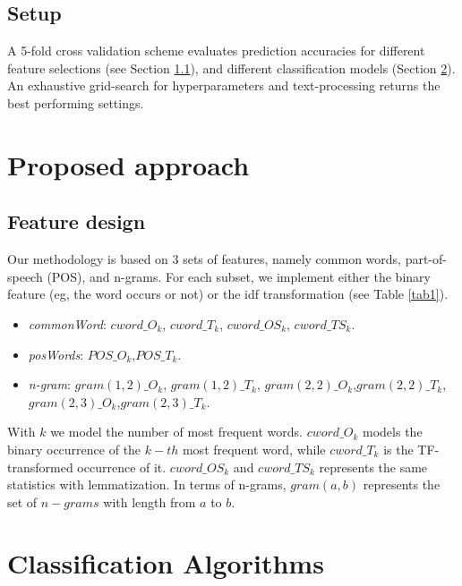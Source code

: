 \documentclass[twoside,twocolumn]{article}
\begin{document}
	
\subsection{Setup}
\label{sub:setup}
A 5-fold cross validation scheme evaluates prediction accuracies for different feature selections (see Section \ref{feature}), and different classification models (Section \ref{class}).
An exhaustive grid-search for hyperparameters and text-processing returns the best performing settings.
\section{Proposed approach}
\subsection{Feature design} \label{feature}
Our methodology is based on 3 sets of features, namely common words, part-of-speech (POS), and n-grams. For each subset, we implement either the binary feature (eg, the word occurs or not) or the idf transformation (see Table \ref{tab1}).

\begin{itemize}
	\item \textit{commonWord}: $cword\_O_{k}$, $cword\_T_{k}$, $cword\_OS_{k}$, $cword\_TS_{k}$.
	\item \textit{posWords}: $POS\_O_{k}$,$POS\_T_{k}$.
	\item \textit{n-gram}: $gram(1,2)\_O_{k}$, $gram(1,2)\_T_{k}$, $gram(2,2)\_O_{k}$,$gram(2,2)\_T_{k}$, $gram(2,3)\_O_{k}$,$gram(2,3)\_T_{k}$.
\end{itemize}
With $k$ we model the number of most frequent words. $cword\_O_k$ models the binary occurrence of the $k-th$ most frequent word, while $cword\_T_k$ is the TF-transformed occurrence of it. $cword\_OS_k$ and $cword\_TS_k$ represents the same statistics with lemmatization. In terms of n-grams, $gram(a,b)$ represents the set of $n-grams$ with length from $a$ to $b$.




\section{Classification Algorithms}
\label{class}
\end{document}
